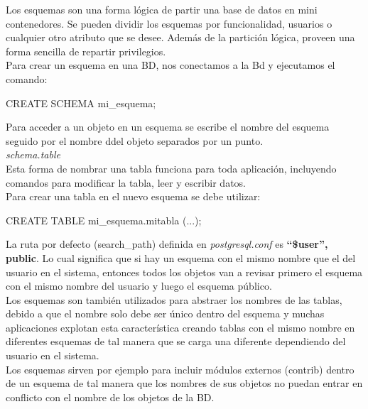 Los esquemas son una forma lógica de partir una base de datos en mini contenedores. Se pueden dividir los esquemas por funcionalidad, usuarios o cualquier otro atributo que se desee. Además de la partición lógica, proveen una forma sencilla de repartir privilegios. \\

Para crear un esquema en una BD, nos conectamos a la Bd y ejecutamos el comando:\\

\begin{pyglist}
CREATE SCHEMA mi_esquema;
\end{pyglist}

Para acceder a un objeto en un esquema se escribe el nombre del esquema seguido por el nombre ddel objeto separados por un punto.\\

\textit{schema.table}\\

Esta forma de nombrar una tabla funciona para toda aplicación, incluyendo comandos para modificar la tabla, leer y escribir datos.\\

Para crear una tabla en el nuevo esquema se debe utilizar:\\

\begin{pyglist}
CREATE TABLE mi_esquema.mitabla (...);
\end{pyglist}

La ruta por defecto (search\_path) definida en \textit{postgresql.conf} es \textbf{“\$user”, public}. Lo cual significa que si hay un esquema con el mismo nombre que el del usuario en el sistema, entonces todos los objetos van a revisar primero el esquema con el mismo nombre del usuario y luego el esquema público.\\

Los esquemas son también utilizados para abstraer los nombres de las tablas, debido a que el nombre solo debe ser único dentro del esquema y muchas aplicaciones explotan esta característica creando tablas con el mismo nombre en diferentes esquemas de tal manera que se carga una diferente dependiendo del usuario en el sistema.\\

Los esquemas sirven por ejemplo para incluir módulos externos (contrib) dentro de un esquema de tal manera que los nombres de sus objetos no puedan entrar en conflicto con el nombre de los objetos de la BD.\\

